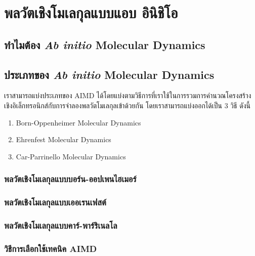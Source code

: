 

\chapter{พลวัตเชิงโมเลกุลแบบแอบ อินิชิโอ}
\label{ch:aimd}

\section{ทำไมต้อง \textit{Ab initio} Molecular Dynamics}


\section{ประเภทของ \textit{Ab initio} Molecular Dynamics}

เราสามารถแบ่งประเภทของ AIMD ได้โดยแบ่งตามวิธีการที่เราใช้ในการรวมการคำนวณโครงสร้างเชิงอิเล็กทรอนิกส์กับการจำลองพลวัตโมเลกุลเข้าด้วยกัน 
โดยเราสามารถแบ่งออกได้เป็น 3 วิธี ดังนี้ 

\begin{enumerate}
    \item Born-Oppenheimer Molecular Dynamics
    \item Ehrenfest Molecular Dynamics
    \item Car-Parrinello Molecular Dynamics
\end{enumerate}

\subsection{พลวัตเชิงโมเลกุลแบบบอร์น-ออปเพนไฮเมอร์}

\subsection{พลวัตเชิงโมเลกุลแบบเออเรนเฟสต์}

\subsection{พลวัตเชิงโมเลกุลแบบคาร์-พาร์ริเนลโล}

\subsection{วิธีการเลือกใช้เทคนิค AIMD}

